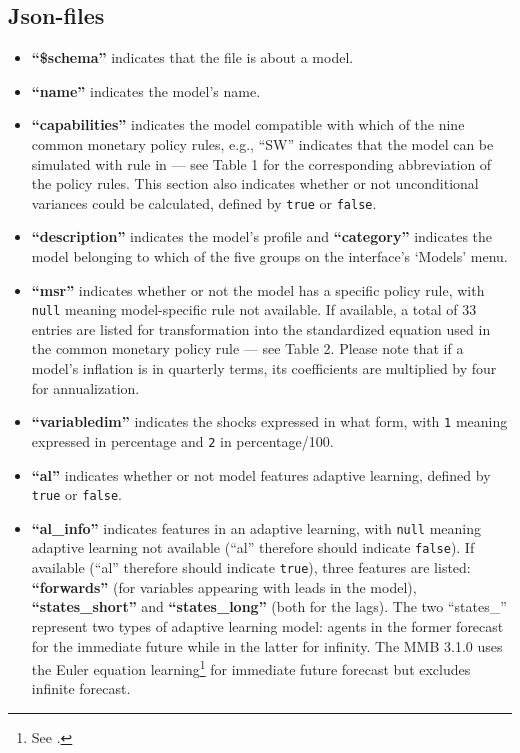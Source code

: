 \documentclass[10pt,a4paper]{article}
\begin{document}
\subsection{Json-files}
\label{sec:Json}
\bigskip

\begin{itemize}

\item \textbf{“\$schema”} indicates that the file is about a model.

\item \textbf{“name”} indicates the model’s name.

\item \textbf{“capabilities”} indicates the model compatible with which of the nine common monetary policy rules, e.g., “SW” indicates that the model can be simulated with rule in \cite{SmetsWouters2007} — see Table 1 for the corresponding abbreviation of the policy rules. This section also indicates whether or not unconditional variances could be calculated, defined by \texttt{true} or \texttt{false}.
\medskip

\item \textbf{“description”} indicates the model's profile and \textbf{“category”} indicates the model belonging to which of the five groups on the interface’s ‘Models’ menu.

\item \textbf{“msr”} indicates whether or not the model has a specific policy rule, with \texttt{null} meaning model-specific rule not available. If available, a total of 33 entries are listed for transformation into the standardized equation used in the common monetary policy rule — see Table 2. Please note that if a model’s inflation is in quarterly terms, its coefficients are multiplied by four for annualization.

\item \textbf{“variabledim”} indicates the shocks expressed in what form, with \texttt{1} meaning expressed in percentage and \texttt{2} in percentage/100.

\item \textbf{“al”} indicates whether or not model features adaptive learning, defined by \texttt{true} or \texttt{false}.

\item \textbf{“al\_info”} indicates features in an adaptive learning, with \texttt{null} meaning adaptive learning not available (“al” therefore should indicate \texttt{false}). If available (“al” therefore should indicate \texttt{true}), three features are listed: \textbf{“forwards”} (for variables appearing with leads in the model), \textbf{“states\_short”} and \textbf{“states\_long”} (both for the lags). The two “states\_” represent two types of adaptive learning model: agents in the former forecast for the immediate future while in the latter for infinity. The MMB 3.1.0 uses the Euler equation learning\footnote{See \cite{Slobodyan2012}.} for immediate future forecast but excludes infinite forecast.


\end{itemize}
\end{document}

